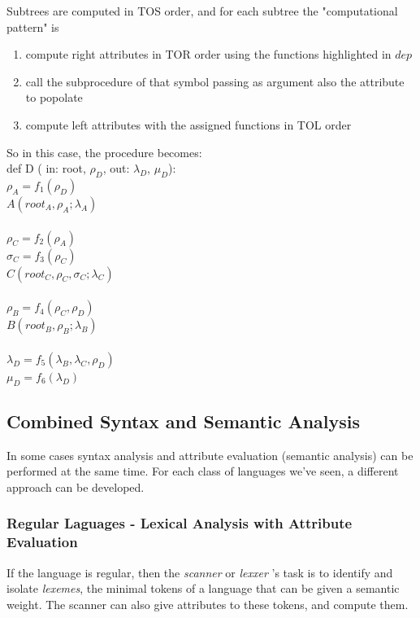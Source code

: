 				Subtrees are computed in TOS order, and for each subtree the "computational pattern" is
				\begin{enumerate}
					\item compute right attributes in TOR order using the functions highlighted in $dep$
					\item call the subprocedure of that symbol passing as argument also the attribute to popolate
					\item compute left attributes with the assigned functions in TOL order
				\end{enumerate}
				
				So in this case, the procedure becomes:\\
				def D ( in: root, $\rho_D$, out: $\lambda_D$, $\mu_D$):\\
			    $\rho_A = f_1(\rho_D)$\\
			    $A(root_A, \rho_A; \lambda_A)$\\\\
				$\rho_C = f_2(\rho_A)$\\
				$\sigma_C = f_3(\rho_C)$\\
				$C(root_C, \rho_C, \sigma_C; \lambda_C)$\\\\
				$\rho_B = f_4(\rho_C, \rho_D)$\\
				$B(root_B, \rho_B; \lambda_B)$\\\\
				$\lambda_D = f_5(\lambda_B, \lambda_C, \rho_D)$\\
				$\mu_D = f_6(\lambda_D)$\\
	
	\subsection{Combined Syntax and Semantic Analysis}
		In some cases syntax analysis and attribute evaluation (semantic analysis) can be performed at the same time. For each class of languages we've seen, a 
		different approach can be developed.
		
		\subsubsection{Regular Laguages - Lexical Analysis with Attribute Evaluation}
			If the language is regular, then the \emph{scanner} or \emph{lexxer} 's task is to identify and isolate \emph{lexemes}, the minimal tokens of a language 
			that can be given a semantic weight. The scanner can also give attributes to these tokens, and compute them.
		
